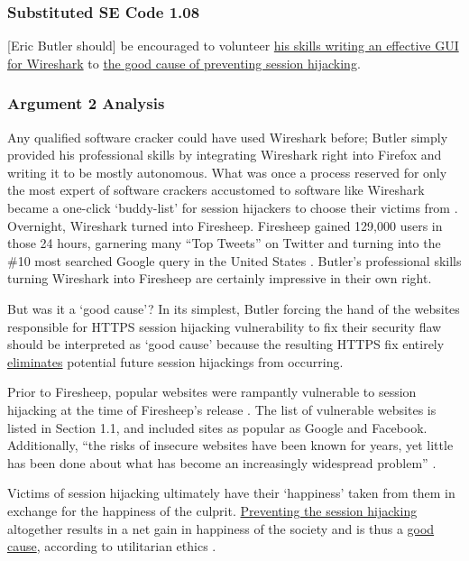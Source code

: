 \documentclass[11pt]{article}
\begin{document}
\begin{multicols}{2}
\subsubsection{Substituted SE Code 1.08}
[Eric Butler should] be encouraged to volunteer \uline{his skills writing an effective GUI for Wireshark} to \uline{the good cause of preventing session hijacking}.

\subsubsection{Argument 2 Analysis}
Any qualified software cracker could have used Wireshark before; Butler simply provided his professional skills by integrating Wireshark right into Firefox and writing it to be mostly autonomous. What was once a process reserved for only the most expert of software crackers accustomed to software like Wireshark became a one-click `buddy-list' for session hijackers to choose their victims from \cite{eric-butler}. Overnight, Wireshark turned into Firesheep. Firesheep gained 129,000 users in those 24 hours, garnering many ``Top Tweets'' on Twitter and turning into the \#10 most searched Google query in the United States \cite{firesheep-day-later}. Butler's professional skills turning Wireshark into Firesheep are certainly impressive in their own right.

But was it a `good cause'? In its simplest, Butler forcing the hand of the websites responsible for HTTPS session hijacking vulnerability to fix their security flaw should be interpreted as `good cause' because the resulting HTTPS fix entirely \uline{eliminates} potential future session hijackings from occurring. 

Prior to Firesheep, popular websites were rampantly vulnerable to session hijacking at the time of Firesheep's release \cite{firesheep-source}. The list of vulnerable websites is listed in Section 1.1, and included sites as popular as Google and Facebook. Additionally, ``the risks of insecure websites have been known for years, yet little has been done about what has become an increasingly widespread problem'' \cite{butler-fallout}. 

Victims of session hijacking ultimately have their `happiness' taken from them in exchange for the happiness of the culprit. \uline{Preventing the session hijacking} altogether results in a net gain in happiness of the society and is thus a \uline{good cause}, according to utilitarian ethics \cite{virtue-ethics}. 


\end{multicols}
\end{document}
